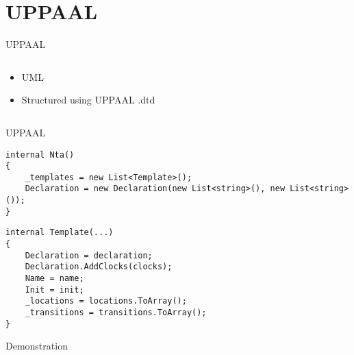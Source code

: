 \section{UPPAAL}
\begin{frame}{UPPAAL}
    \begin{columns}
        \begin{column}{0.4\textwidth}
            \begin{itemize}
                \item UML
                \item Structured using UPPAAL .dtd
            \end{itemize}
        \end{column}
        \begin{column}{0.6\textwidth}
            \scalebox{0.8}{
                
            }
        \end{column}
    \end{columns}

\end{frame}
\begin{frame}[fragile]{UPPAAL}

    \begin{lstlisting}[style=csharp]
internal Nta()
{
    _templates = new List<Template>();
    Declaration = new Declaration(new List<string>(), new List<string>());
}    
    \end{lstlisting}
    \vspace{1em}
    \begin{lstlisting}[style=csharp]
internal Template(...)
{
    Declaration = declaration;
    Declaration.AddClocks(clocks);
    Name = name;
    Init = init;
    _locations = locations.ToArray();
    _transitions = transitions.ToArray();
}  
    \end{lstlisting}
\end{frame}

\begin{frame}{Demonstration}

\end{frame}


